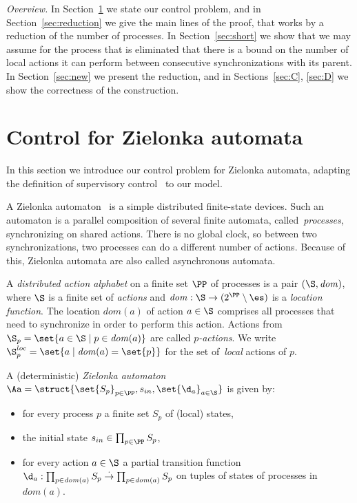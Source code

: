 \documentclass[10pt,a4paper]{article}
\newcommand{\Sloc}{\S^{loc}}
\newcommand{\loc}{\mathit{dom}}
\newcommand{\dom}{\mathit{dom}}
\begin{document}
\emph{Overview.} In Section~\ref{sec:defs} we state our control
problem, and in Section~\ref{sec:reduction} we give the main lines of
the proof, that works by a reduction of the number of processes. In
Section~\ref{sec:short} we show that we may assume for the process
that is eliminated that there is a bound on the number of local actions
it can perform between consecutive synchronizations with its
parent. In Section~\ref{sec:new} we present the reduction, and in
Sections~\ref{sec:C}, \ref{sec:D} we show the correctness of the
construction. 






\section{Control for Zielonka automata}\label{sec:defs}

In this section we introduce our control problem for Zielonka
automata, adapting  the definition of
supervisory control~\cite{RW89} to our model. 




A Zielonka automaton~\cite{zie87,ms97} is a simple
distributed finite-state devices. Such an automaton is a parallel
composition of several finite automata, called~\emph{processes},
synchronizing on shared actions. There is no global clock, so between
two synchronizations, two processes can do a different number of
actions. Because of this, Zielonka automata are also called
asynchronous automata.

A \emph{distributed action alphabet} on a finite set $\PP$ of processes is a
pair $(\S,\loc)$, where $\S$ is a finite set of \emph{actions} and
$\loc:\S \to (2^{\PP}\setminus \es)$ is a \emph{location
  function}. The location $\loc(a)$ of action $a \in\S$ comprises all
processes  that need to synchronize in order to perform this
action. Actions from $\S_p=\set{a \in\S \mid p
\in\loc(a)}$ are called \emph{$p$-actions}. 
We write $\Sloc_p=\set{a \mid \dom(a)=\set{p}}$
for the set of~\emph{local} actions of $p$. 


A (deterministic) \emph{Zielonka automaton}
$\Aa=\struct{\set{S_p}_{p\in \PP},s_{in},\set{\d_a}_{a\in\S}}$ is
given by:
\begin{itemize}
\item for every process $p$ a finite set $S_p$ of (local) states,
\item the initial state $s_{in} \in \prod_{p \in \PP} S_p$, 
\item for every action $a \in\S$ a partial transition function
  $\d_a:\prod_{p\in \loc(a)}S_p\stackrel{\cdot}{\to} \prod_{p\in
    \loc(a)}S_p$ on tuples of states of processes in $\loc(a)$.
\end{itemize}
\end{document}
